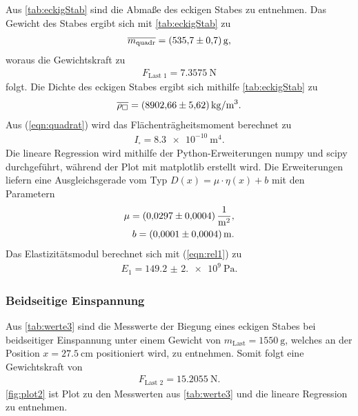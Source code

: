 \sloppy
Aus \autoref{tab:eckigStab} sind die Abmaße des eckigen Stabes zu entnehmen. Das Gewicht des Stabes ergibt sich mit \autoref{tab:eckigStab} zu 
\begin{align*}
  \overline{m_{\text{quadr}}} = \SI{535,7 (0,7)}{\gram},
\end{align*}
woraus die Gewichtskraft zu 
\begin{align*}
  F_{\text{Last 1}} = \SI{7,3575}{\newton}
\end{align*} 
folgt. 
Die Dichte des eckigen Stabes ergibt sich mithilfe \autoref{tab:eckigStab} zu
\begin{align*}
  \overline{\rho_\square} = \SI{8902.66 (5.62)}{\kilo\gram\per\meter^3}.
\end{align*}
Aus (\ref{eqn:quadrat}) wird das Flächenträgheitsmoment berechnet zu
\begin{align*}
  I_{\square} = \SI{8.3e-10}{\meter^4}.
\end{align*}
Die lineare Regression wird mithilfe der Python-Erweiterungen numpy \cite{numpy} und scipy \cite{scipy} durchgeführt, während
der Plot mit matplotlib \cite{matplotlib} erstellt wird. Die Erweiterungen liefern eine Ausgleichsgerade vom Typ $D(x) = \mu\cdot\eta(x)+b$
mit den Parametern
\begin{align*}
  \mu = \SI{0.0297 (0.0004)}{\per\square\meter}, \\
  b = \SI{0.0001 (0.0004)}{\meter}. \\
\end{align*}
Das Elastizitätsmodul berechnet sich mit (\ref{eqn:rel1}) zu
\begin{align*}
  E_1 = \SI{149.2(2.0)e9}{\Pa}.
\end{align*}

\subsubsection{Beidseitige Einspannung}
\label{subsubsec:beidsEck}
Aus \autoref{tab:werte3} sind die Messwerte der Biegung eines eckigen Stabes bei beidseitiger Einspannung unter einem Gewicht von
$m_{\text{Last}} = \SI{1550}{\gram}$, welches an der Position $x= \SI{27.5}{\cm}$ positioniert wird, zu entnehmen.
Somit folgt eine Gewichtskraft von 
\begin{align*}
  F_{\text{Last 2}} = \SI{15.2055}{\newton}.
\end{align*}
\autoref{fig:plot2} ist Plot zu den Messwerten aus \autoref{tab:werte3} und die lineare Regression zu entnehmen.



